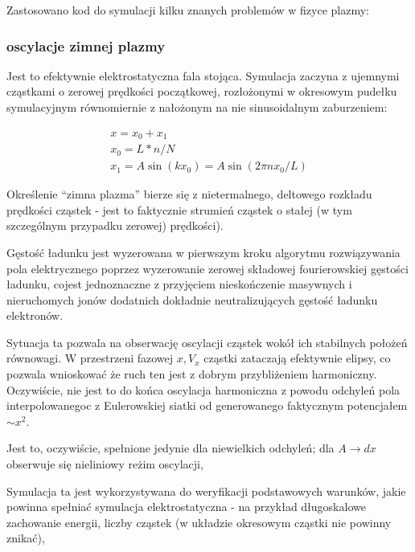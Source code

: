     Zastosowano kod do symulacji kilku znanych problemów w fizyce plazmy:
    \subsubsection{oscylacje zimnej plazmy}
    Jest to efektywnie elektrostatyczna fala stojąca. Symulacja zaczyna z ujemnymi cząstkami
o zerowej prędkości początkowej, rozłożonymi w okresowym pudełku symulacyjnym
równomiernie z nałożonym na nie sinusoidalnym zaburzeniem:

\begin{align}
x = x_0 + x_1\\
x_0 = L * n / N\\
x_1 = A  \sin(k x_0)=A \sin(2 \pi n x_0 / L)
\end{align}

Określenie ``zimna plazma'' bierze się z nietermalnego, deltowego
rozkładu prędkości cząstek - jest to faktycznie strumień cząstek o stałej
(w tym szczególnym przypadku zerowej) prędkości).

Gęstość ładunku jest wyzerowana w pierwszym kroku algorytmu rozwiązywania pola elektrycznego
poprzez wyzerowanie zerowej składowej fourierowskiej gęstości ładunku, cojest jednoznaczne
z przyjęciem nieskończenie masywnych i nieruchomych jonów dodatnich dokładnie neutralizujących gęstość
ładunku elektronów.

Sytuacja ta
pozwala na obserwację oscylacji cząstek wokół ich stabilnych położeń
równowagi. W przestrzeni fazowej $x, V_x$ cząstki zataczają efektywnie
elipsy, co pozwala wnioskować że ruch ten jest z dobrym przybliżeniem harmoniczny.
Oczywiście, nie jest to do końca oscylacja harmoniczna z powodu odchyleń pola interpolowanegoc
z Eulerowskiej siatki od generowanego faktycznym potencjałem $ \sim x^2 $.

Jest to, oczywiście, spełnione jedynie dla niewielkich odchyleń; dla $A \to
dx$  obserwuje się nieliniowy reżim oscylacji,

Symulacja ta jest wykorzystywana do weryfikacji podstawowych warunków, jakie powinna spełniać
symulacja elektrostatyczna - na przykład długoskalowe zachowanie energii, liczby cząstek (w układzie okresowym cząstki nie powinny
znikać), %


